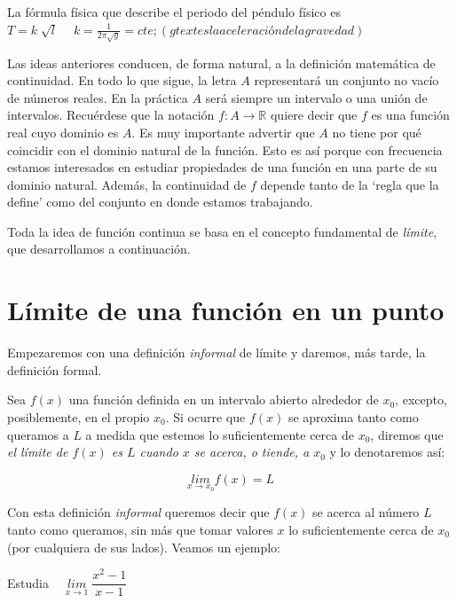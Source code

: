 \textcolor{gris}{La fórmula física que describe el periodo del péndulo físico es $T=k\; \sqrt{l}\; \quad k=\frac {1}{2\pi \sqrt{g} }=cte; (g text{ es la aceleración de la gravedad})$}

	Las ideas anteriores conducen, de forma natural, a la definición matemática de continuidad. En todo lo que sigue, la letra $A$ representará un conjunto no vacío de números reales. En la práctica $A$ será siempre un intervalo o una unión de intervalos. Recuérdese que la notación $f : A \to \mathbb R$ quiere decir que $f$ es una función real cuyo dominio es $A$. Es muy importante advertir que $A$ no tiene por qué coincidir con el dominio natural de la función. Esto es así porque con frecuencia estamos interesados en estudiar propiedades de una función en una parte de su dominio natural. Además, la continuidad de $f$ depende tanto de la `regla que la define' como del conjunto en donde estamos trabajando. 
	
	Toda la idea de función continua se basa en el concepto fundamental de \emph{límite}, que desarrollamos a continuación.
	
	
	\section{Límite de una función en un punto}
	
	Empezaremos con una definición \emph{informal} de límite y daremos, más tarde, la definición formal.
	
	\begin{defi}
	
	Sea $f(x)$ una función definida en un intervalo abierto alrededor de $x_0$, excepto, posiblemente, en el propio $x_0$. Si ocurre que $f(x)$ se aproxima tanto como queramos a $L$ a medida que estemos lo suficientemente cerca de $x_0$, diremos que \textit{el límite de $f(x)$ es $L$ cuando $x$ se acerca, o tiende, a $x_0$} y lo denotaremos así:
	
	\begin{equation}
		\underset { x\rightarrow x_0 }{ lim } {f(x)}=L
	\end{equation}
		
	\end{defi}

	
	Con esta definición \emph{informal} queremos decir que $f(x)$ se acerca al número $L$ tanto como queramos, sin más que tomar valores $x$ lo suficientemente cerca de $x_0$ (por cualquiera de sus lados). Veamos un ejemplo:
	
	\begin{ejem}
		Estudia $\quad \underset { x\rightarrow 1 }{ lim } \; {\dfrac {x^2-1}{x-1}}$
	\end{ejem}
	
